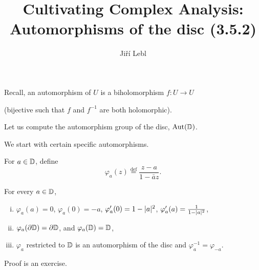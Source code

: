 \documentclass[10pt,aspectratio=169]{beamer}
\author{Ji\v{r}\'i Lebl}
\institute[OSU]{%
Departemento pri Matematiko de Oklahoma {\^S}tata Universitato}
\title{Cultivating Complex Analysis:\\%
Automorphisms of the disc (3.5.2)}
\date{}
\begin{document}
\begin{frame}
\titlepage
\end{frame}

\begin{frame}
Recall, an automorphism of $U$ is a biholomorphism $f \colon U \to U$

(bijective such that $f$ and $f^{-1}$ are both holomorphic).

\medskip
\pause

Let us compute the automorphism group of the disc, $\operatorname{Aut}({\mathbb{D}})$.

\medskip
\pause

We start with certain specific automorphisms.

\medskip
\pause

For $a \in {\mathbb{D}}$, define
\[
\varphi_a(z) \overset{\text{def}}{=} \frac{z-a}{1-\bar{a}z}.
\]

\pause

\begin{proposition}
For every $a \in {\mathbb{D}}$,
\begin{enumerate}[(i)]
\item
$\varphi_a(a) = 0$, \enspace
$\varphi_a(0) = -a$, \enspace
$\varphi_a'(0) = 1 - \lvert {a} \rvert^2$, \enspace
$\varphi_a'(a) = \frac{1}{1 - \lvert {a} \rvert^2}$,
\pause
\item
$\varphi_a(\partial {\mathbb{D}}) = \partial {\mathbb{D}}$,
and
$\varphi_a({\mathbb{D}}) = {\mathbb{D}}$,
\pause
\item
$\varphi_a$ restricted to ${\mathbb{D}}$ is an automorphism of the disc and
$\varphi_a^{-1} = \varphi_{-a}$.
\end{enumerate}
\end{proposition}
\pause

Proof is an exercise.
\end{frame}
\end{document}

